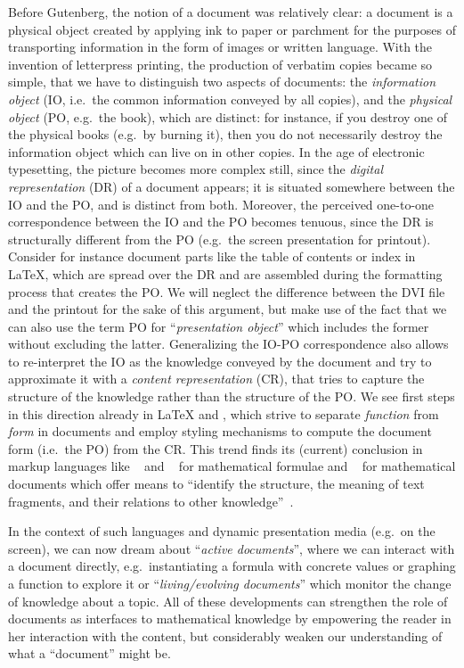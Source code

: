 \documentclass[a4paper]{article}
\begin{document}
Before Gutenberg, the notion of a document was relatively clear: a document is a physical
object created by applying ink to paper or parchment for the purposes of transporting
information in the form of images or written language. With the invention of letterpress
printing, the production of verbatim copies became so simple, that we have to distinguish
two aspects of documents: the {\emph{information object}} (IO, i.e.\ the common
information conveyed by all copies), and the {\emph{physical object}} (PO, e.g.\ the
book), which are distinct: for instance, if you destroy one of the physical books (e.g.\
by burning it), then you do not necessarily destroy the information object which can live
on in other copies. In the age of electronic typesetting, the picture becomes more complex
still, since the {\emph{digital representation}} (DR) of a document appears; it is
situated somewhere between the IO and the PO, and is distinct from both. Moreover, the
perceived one-to-one correspondence between the IO and the PO becomes tenuous, since the
DR is structurally different from the PO (e.g.\ the screen presentation for printout).
Consider for instance document parts like the table of contents or index in {\LaTeX},
which are spread over the DR and are assembled during the formatting process that creates
the PO. We will neglect the difference between the DVI file and the printout for the sake
of this argument, but make use of the fact that we can also use the term PO for
``{\emph{presentation object}}'' which includes the former without excluding the
latter. Generalizing the IO-PO correspondence also allows to re-interpret the IO as the
knowledge conveyed by the document and try to approximate it with a {\emph{content
    representation}} (CR), that tries to capture the structure of the knowledge rather
than the structure of the PO. We see first steps in this direction already in {\LaTeX} and
{\sc{sgml}}, which strive to separate {\emph{function}} from {\emph{form}} in documents
and employ styling mechanisms to compute the document form (i.e.\ the PO) from the
CR. This trend finds its (current) conclusion in markup languages like
{\openmath}~\cite{BusCapCar:2oms04} and {\mathml}~\cite{CarIon:MathML03} for mathematical
formulae and {\omdoc}~\cite{Kohlhase:omdoc1.2} for mathematical documents which offer
means to ``identify the structure, the meaning of text fragments, and their relations to
other knowledge''~\cite{Kohlhase:omdoc1.2}.

In the context of such languages and dynamic presentation media (e.g.\ on the screen), we
can now dream about ``{\emph{active documents}}'', where we can interact with a document
directly, e.g.\ instantiating a formula with concrete values or graphing a function to
explore it or ``{\emph{living/evolving documents}}'' which monitor the change of knowledge
about a topic. All of these developments can strengthen the role of documents as
interfaces to mathematical knowledge by empowering the reader in her interaction with the
content, but considerably weaken our understanding of what a ``document'' might be.
\end{document}
